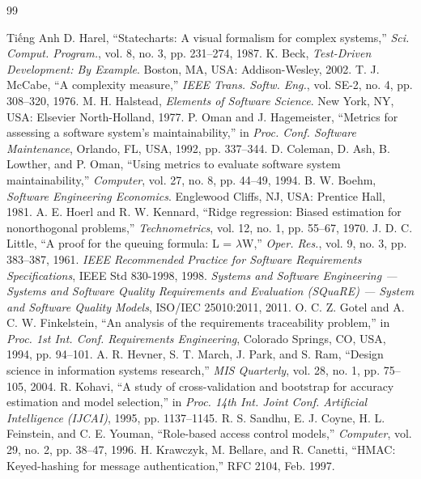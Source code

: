 \begin{thebibliography}{99}
\begin{bibsection}{Tiếng Anh}
	D. Harel, ``Statecharts: A visual formalism for complex systems,'' \textit{Sci. Comput. Program.}, vol. 8, no. 3, pp. 231--274, 1987.
	K. Beck, \textit{Test-Driven Development: By Example}. Boston, MA, USA: Addison-Wesley, 2002.
	T. J. McCabe, ``A complexity measure,'' \textit{IEEE Trans. Softw. Eng.}, vol. SE-2, no. 4, pp. 308--320, 1976.
	M. H. Halstead, \textit{Elements of Software Science}. New York, NY, USA: Elsevier North-Holland, 1977.
	P. Oman and J. Hagemeister, ``Metrics for assessing a software system's maintainability,'' in \textit{Proc. Conf. Software Maintenance}, Orlando, FL, USA, 1992, pp. 337--344.
	D. Coleman, D. Ash, B. Lowther, and P. Oman, ``Using metrics to evaluate software system maintainability,'' \textit{Computer}, vol. 27, no. 8, pp. 44--49, 1994.
	B. W. Boehm, \textit{Software Engineering Economics}. Englewood Cliffs, NJ, USA: Prentice Hall, 1981.
	A. E. Hoerl and R. W. Kennard, ``Ridge regression: Biased estimation for nonorthogonal problems,'' \textit{Technometrics}, vol. 12, no. 1, pp. 55--67, 1970.
	J. D. C. Little, ``A proof for the queuing formula: L = $\lambda$W,'' \textit{Oper. Res.}, vol. 9, no. 3, pp. 383--387, 1961.
	\textit{IEEE Recommended Practice for Software Requirements Specifications}, IEEE Std 830-1998, 1998.
	\textit{Systems and Software Engineering --- Systems and Software Quality Requirements and Evaluation (SQuaRE) --- System and Software Quality Models}, ISO/IEC 25010:2011, 2011.
	O. C. Z. Gotel and A. C. W. Finkelstein, ``An analysis of the requirements traceability problem,'' in \textit{Proc. 1st Int. Conf. Requirements Engineering}, Colorado Springs, CO, USA, 1994, pp. 94--101.
	A. R. Hevner, S. T. March, J. Park, and S. Ram, ``Design science in information systems research,'' \textit{MIS Quarterly}, vol. 28, no. 1, pp. 75--105, 2004.
	R. Kohavi, ``A study of cross-validation and bootstrap for accuracy estimation and model selection,'' in \textit{Proc. 14th Int. Joint Conf. Artificial Intelligence (IJCAI)}, 1995, pp. 1137--1145.
	R. S. Sandhu, E. J. Coyne, H. L. Feinstein, and C. E. Youman, ``Role-based access control models,'' \textit{Computer}, vol. 29, no. 2, pp. 38--47, 1996.
	H. Krawczyk, M. Bellare, and R. Canetti, ``HMAC: Keyed-hashing for message authentication,'' RFC 2104, Feb. 1997.

\end{bibsection}
\end{thebibliography}

